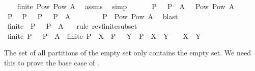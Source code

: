 \begin{isabellebody}
\isanewline
\isanewline
{}\isamarkupfalse%
\isanewline
\ \ \isamarkupfalse%
\ {\isachardoublequoteopen}finite\ {\isacharparenleft}Pow\ {\isacharparenleft}Pow\ A{\isacharparenright}{\isacharparenright}{\isachardoublequoteclose}\ \isamarkupfalse%
\ assms\ \isamarkupfalse%
\ simp\isanewline
\ \ \isamarkupfalse%
\ \isamarkupfalse%
\ {\isachardoublequoteopen}{\isacharbraceleft}\ P\ {\isachardot}\ {\isasymUnion}\ P\ {\isacharequal}\ A\ {\isacharbraceright}\ {\isasymsubseteq}\ Pow\ {\isacharparenleft}Pow\ A{\isacharparenright}{\isachardoublequoteclose}\isanewline
\ \ \isamarkupfalse%
\isanewline
\ \ \ \ \isamarkupfalse%
\ P\ \isamarkupfalse%
\ {\isachardoublequoteopen}P\ {\isasymin}\ {\isacharbraceleft}\ P\ {\isachardot}\ {\isasymUnion}\ P\ {\isacharequal}\ A\ {\isacharbraceright}{\isachardoublequoteclose}\isanewline
\ \ \ \ \isamarkupfalse%
\ \isamarkupfalse%
\ {\isachardoublequoteopen}P\ {\isasymin}\ Pow\ {\isacharparenleft}Pow\ A{\isacharparenright}{\isachardoublequoteclose}\ \isamarkupfalse%
\ blast\isanewline
\ \ \isamarkupfalse%
\isanewline
\ \ \isamarkupfalse%
\ \isamarkupfalse%
\ {\isachardoublequoteopen}finite\ {\isacharbraceleft}\ P\ {\isachardot}\ {\isasymUnion}\ P\ {\isacharequal}\ A\ {\isacharbraceright}{\isachardoublequoteclose}\ \isamarkupfalse%
\ {\isacharparenleft}rule\ rev{\isacharunderscore}finite{\isacharunderscore}subset{\isacharparenright}\isanewline
\ \ \ \ \isanewline
\ \ \isamarkupfalse%
\ \isamarkupfalse%
\ {\isachardoublequoteopen}finite\ {\isacharbraceleft}P\ {\isachardot}\ {\isasymUnion}\ P\ {\isacharequal}\ A{\isacharbraceright}\ {\isasymor}\ finite\ {\isacharbraceleft}P{\isachardot}\ {\isasymforall}\ X\ {\isasymin}\ P\ {\isachardot}\ {\isasymforall}\ Y\ {\isasymin}\ P\ {\isachardot}\ {\isacharparenleft}X\ {\isasyminter}\ Y\ {\isasymnoteq}\ {\isacharbraceleft}{\isacharbraceright}{\isacharparenright}\ {\isasymlongleftrightarrow}\ X\ {\isacharequal}\ Y{\isacharbraceright}{\isachardoublequoteclose}\ \isacommand{{\isachardot}{\isachardot}}\isamarkupfalse%
\isanewline
{}\isamarkupfalse%
%
\endisatagproof
{\isafoldproof}%
%
\isadelimproof
%
\endisadelimproof
%
\begin{isamarkuptext}%
The set of all partitions of the empty set only contains the empty set.
  We need this to prove the base case of .%

\end{isamarkuptext}
\end{isabellebody}
